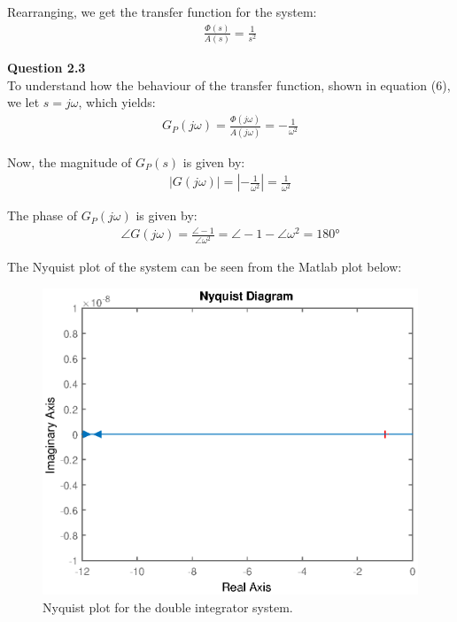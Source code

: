 \documentclass{article}
\begin{document}
	Rearranging, we get the transfer function for the system:
	\begin{align}
		\frac{\Phi (s)}{A(s)} = \frac{1}{s^2}
	\end{align}
	


    \textbf{Question 2.3}\\
    
    To understand how the behaviour of the transfer function, shown in equation (6), we let $s = j \omega$, which yields:
    \begin{align*}
	    G_P(j \omega) = \frac{\Phi (j \omega)}{A(j \omega)} = -\frac{1}{\omega^2}
    \end{align*}
    	
	Now, the magnitude of $G_P(s)$ is given by:
	\begin{align}
		|G(j \omega)| = |-\frac{1}{\omega^2}| = \frac{1}{\omega^2}
	\end{align}

	The phase of $G_P(j \omega)$ is given by:
	\begin{align}
		\angle G(j \omega) = \frac{\angle -1}{\angle \omega^2} = \angle -1 - \angle \omega^2 = 180 \si{\degree}
	\end{align}
	
	The Nyquist plot of the system can be seen from the Matlab plot below:
	\begin{figure}[h]
		\centering
		\includegraphics[scale=0.5]{fig1.eps}
		\caption{Nyquist plot for the double integrator system.}
	\end{figure}
	
\end{document}
